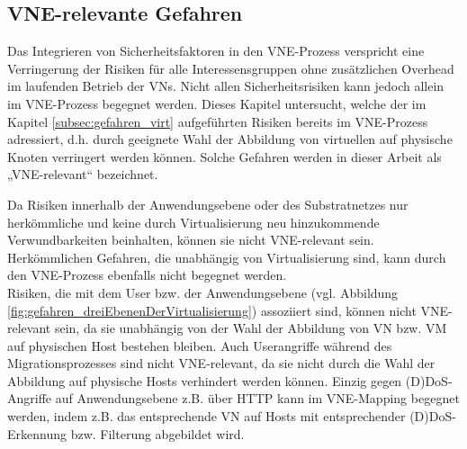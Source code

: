 \documentclass{lni}
\begin{document}




\subsection{VNE-relevante Gefahren}
\label{subsec:gefahren_vnerelevant}	
Das Integrieren von Sicherheitsfaktoren in den VNE-Prozess verspricht eine Verringerung der Risiken für alle Interessensgruppen ohne zusätzlichen Overhead im laufenden Betrieb der VNs. Nicht allen Sicherheitsrisiken kann jedoch allein im VNE-Prozess begegnet werden. \cite{fischer2013virtual, wang2016towards} 
Dieses Kapitel untersucht, welche der im Kapitel \ref{subsec:gefahren_virt} aufgeführten Risiken bereits im VNE-Prozess adressiert, d.h. durch geeignete Wahl der Abbildung von virtuellen auf physische Knoten verringert werden können. Solche Gefahren werden in dieser Arbeit als „VNE-relevant“ bezeichnet. 

Da Risiken innerhalb der Anwendungsebene oder des Substratnetzes nur herkömmliche und keine durch Virtualisierung neu hinzukommende Verwundbarkeiten beinhalten, können sie nicht VNE-relevant sein. Herkömmlichen Gefahren, die unabhängig von Virtualisierung sind, kann durch den VNE-Prozess ebenfalls nicht begegnet werden.\\
Risiken, die mit dem User bzw. der Anwendungsebene (vgl. Abbildung \ref{fig:gefahren_dreiEbenenDerVirtualisierung}) assoziiert sind, können nicht VNE-relevant sein, da sie unabhängig von der Wahl der Abbildung von VN bzw. VM auf physischen Host bestehen bleiben. Auch Userangriffe während des Migrationsprozesses sind nicht VNE-relevant, da sie nicht durch die Wahl der Abbildung auf physische Hosts verhindert werden können. Einzig gegen (D)DoS-Angriffe auf Anwendungsebene z.B. über HTTP kann im VNE-Mapping begegnet werden, indem z.B. das entsprechende VN auf Hosts mit entsprechender (D)DoS-Erkennung bzw. Filterung abgebildet wird.
\end{document}
